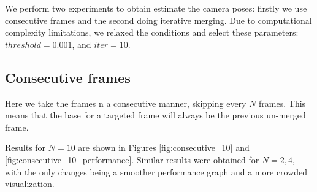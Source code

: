 \documentclass[11pt]{article}
\begin{document}
We perform two experiments to obtain estimate the camera poses: firstly we use consecutive frames and the second doing iterative merging. Due to computational complexity limitations, we relaxed the conditions and select these parameters: $ threshold = 0.001 $, and $iter = 10$.

\subsection{Consecutive frames}
Here we take the frames n a consecutive manner, skipping every $N$ frames. This means that the base for a targeted frame will always be the previous un-merged frame.

Results for $N = 10$ are shown in Figures \ref{fig:consecutive_10} and \ref{fig:consecutive_10_performance}. Similar results were obtained for $N = 2, 4$, with the only changes being a smoother performance graph and a more crowded visualization.
\end{document}
